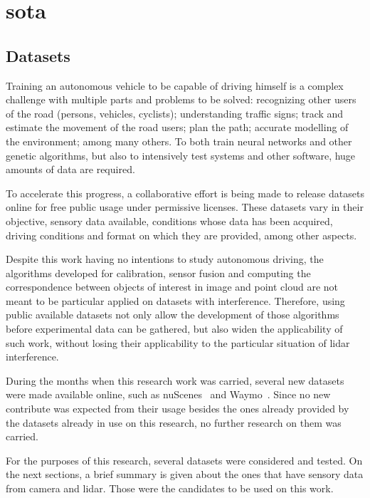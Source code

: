 \chapter{\acl{sota}}
\label{chapter:sota}

\section{Datasets}
\label{section:sota:datasets}

Training an autonomous vehicle to be capable of driving himself is a complex challenge with multiple parts and problems to be solved: recognizing other users of the road (persons, vehicles, cyclists); understanding traffic signs; track and estimate the movement of the road users; plan the path; accurate modelling of the environment; among many others. To both train neural networks and other genetic algorithms, but also to intensively test systems and other software, huge amounts of data are required.

To accelerate this progress, a collaborative effort is being made to release datasets online for free public usage under permissive licenses. These datasets vary in their objective, sensory data available, conditions whose data has been acquired, driving conditions and format on which they are provided, among other aspects. 

Despite this work having no intentions to study autonomous driving, the algorithms developed for calibration, sensor fusion and computing the correspondence between objects of interest in image and point cloud are not meant to be particular applied on datasets with interference. Therefore, using public available datasets not only allow the development of those algorithms before experimental data can be gathered, but also widen the applicability of such work, without losing their applicability to the particular situation of \ac{lidar} interference.

During the months when this research work was carried, several new datasets were made available online, such as nuScenes~\cite{nuScenes2019} and Waymo~\cite{Waymo}. Since no new contribute was expected from their usage besides the ones already provided by the datasets already in use on this research, no further research on them was carried. 

For the purposes of this research, several datasets were considered and tested. On the next sections, a brief summary is given about the ones that have sensory data from camera and \ac{lidar}. Those were the candidates to be used on this work.

